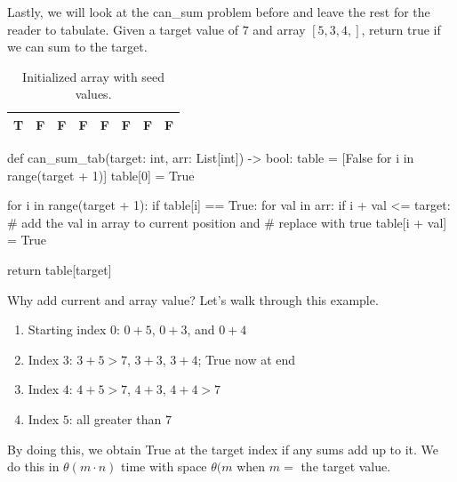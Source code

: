 \documentclass[12pt,dvipsnames,svgnames,x11names]{article}
\begin{document}
Lastly, we will look at the can\_sum problem before and leave the rest for the reader to tabulate. Given
a target value of \(7\) and array \([5, 3, 4,]\), return true if we can sum to the target.
\begin{table}[h]
	\centering
	\begin{tabular}{| *{8}{|c|} |}
  		\hline			
  		T & F & F & F & F & F & F & F \\
  		\hline  
	\end{tabular}
	\caption{Initialized array with seed values.}
	\label{tab:can_sum}
\end{table}
\begin{python}
def can_sum_tab(target: int, arr: List[int]) -> bool:
  table = [False for i in range(target + 1)]
  table[0] = True
    
  for i in range(target + 1):
    if table[i] == True:
      for val in arr:
        if i + val <= target:
          # add the val in array to current position and
          # replace with true
          table[i + val] = True
                    
    return table[target]
\end{python}
Why add current and array value? Let's walk through this example.
\begin{enumerate}
	\item Starting index \(0\): \(0 + 5\), \(0 + 3\), and \(0 + 4\)
	\item Index \(3\): \(3 + 5 > 7\), \(3 + 3\), \(3 + 4\); True now at end
	\item Index \(4\): \(4 + 5 > 7\), \(4 + 3\), \(4 + 4 > 7\)
	\item Index \(5\): all greater than \(7\)
\end{enumerate}
By doing this, we obtain True at the target index if any sums add up to it. We do this in 
\(\theta(m\cdot n)\) time with space \(\theta(m\) when \(m =\) the target value.
\end{document}
